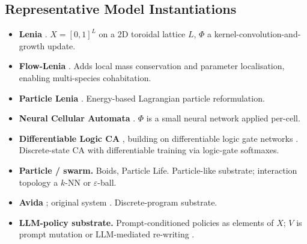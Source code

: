 \documentclass[journal]{IEEEtran}
\theoremstyle{plain}
\theoremstyle{definition}
\theoremstyle{plain}
\begin{document}
\subsection{Representative Model Instantiations}\label{sec:instances}

\begin{itemize}[leftmargin=1.5em,itemsep=3pt]
  \item \textbf{Lenia} \cite{chan2019lenia}. $X = [0,1]^L$ on a 2D toroidal
    lattice $L$, $\Phi$ a
    kernel-convolution-and-growth update.
  \item \textbf{Flow-Lenia} \cite{plantec2023flowlenia,plantec2025flowlenia}.
    Adds local mass conservation and parameter localisation, enabling
    multi-species cohabitation.
  \item \textbf{Particle Lenia} \cite{mordvintsev2022particle}.
    Energy-based Lagrangian particle reformulation.
  \item \textbf{Neural Cellular Automata} \cite{mordvintsev2020nca}. $\Phi$ is a small neural
    network applied per-cell.
  \item \textbf{Differentiable Logic CA} \cite{miotti2025dlca}, building on
    differentiable logic gate networks \cite{petersen2022logic,petersen2024convlogic}.
    Discrete-state CA with differentiable training via logic-gate softmaxes.
  \item \textbf{Particle / swarm.} Boids, Particle Life. Particle-like
    substrate; interaction topology a $k$-NN or $\varepsilon$-ball.
  \item \textbf{Avida} \cite{lenski2003origin}; original system
    \cite{adami1994avida}.
    Discrete-program substrate.
  \item \textbf{LLM-policy substrate.} Prompt-conditioned policies as
    elements of $X$; $V$ is prompt mutation or LLM-mediated re-writing
    \cite{vallinder2024cultural,lehman2024large}.
\end{itemize}
\end{document}
